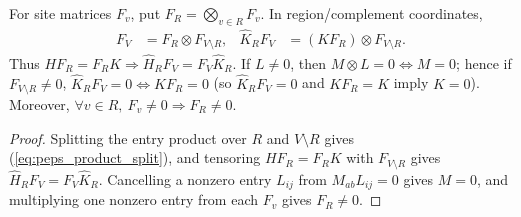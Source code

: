 \begin{lemma}%
    \label{thm:peps_regional_product_cancellation}
    \leanok
    For site matrices $F_v$, put $F_R=\bigotimes_{v\in R}F_v$. In
    region/complement coordinates,
    \begin{align}
        F_V             & =F_R\otimes F_{V\setminus R},    &
        \widehat K_RF_V & =(KF_R)\otimes F_{V\setminus R}.
        \label{eq:peps_product_split}
    \end{align}
    Thus $HF_R=F_RK\Longrightarrow\widehat H_RF_V=F_V\widehat K_R$.
    If $L\ne0$, then $M\otimes L=0\iff M=0$; hence if $F_{V\setminus R}\ne0$,
    $\widehat K_RF_V=0\iff KF_R=0$ (so $\widehat K_RF_V=0$ and $KF_R=K$ imply
    $K=0$). Moreover, $\forall v\in R,\ F_v\ne0\Longrightarrow F_R\ne0$.
\end{lemma}
\begin{proof}\leanok
    Splitting the entry product over $R$ and $V\setminus R$ gives
    (\ref{eq:peps_product_split}), and tensoring $HF_R=F_RK$ with
    $F_{V\setminus R}$ gives $\widehat H_RF_V=F_V\widehat K_R$.
    Cancelling a nonzero entry $L_{ij}$ from $M_{ab}L_{ij}=0$ gives $M=0$, and
    multiplying one nonzero entry from each $F_v$ gives $F_R\ne0$.
\end{proof}

